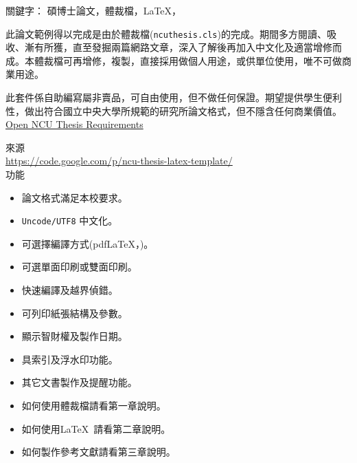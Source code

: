 \begin{abstractcn}

關鍵字： 碩博士論文，體裁檔，\LaTeX，\XeLaTeX
\vspace{2em}

此論文範例得以完成是由於體裁檔({\tt ncuthesis.cls})的完成。期間多方閱讀、吸收、漸有所獲，直至發掘兩篇網路文章，深入了解後再加入中文化及適當增修而成。本體裁檔可再增修，複製，直接採用做個人用途，或供單位使用，唯不可做商業用途。

此套件係自助編寫屬非賣品，可自由使用，但不做任何保證。期望提供學生便利性，做出符合國立中央大學所規範的研究所論文格式，但不隱含任何商業價值。\href{./form03-02-02.doc}{Open NCU Thesis Requirements}

\begin{center}
來源\\
\url{https://code.google.com/p/ncu-thesis-latex-template/}\\
功能
\end{center}
\begin{itemize}
\item 論文格式滿足本校要求。
\item {\tt Uncode/UTF8} 中文化。
\item 可選擇編譯方式(pdf\LaTeX，\XeLaTeX)。
\item 可選單面印刷或雙面印刷。
\item 快速編譯及越界偵錯。
\item 可列印紙張結構及參數。
\item 顯示智財權及製作日期。
\item 具索引及浮水印功能。
\item 其它文書製作及提醒功能。
\item 如何使用體裁檔請看第一章說明。
\item 如何使用\LaTeX\ 請看第二章說明。
\item 如何製作參考文獻請看第三章說明。
\end{itemize}
\end{abstractcn} 